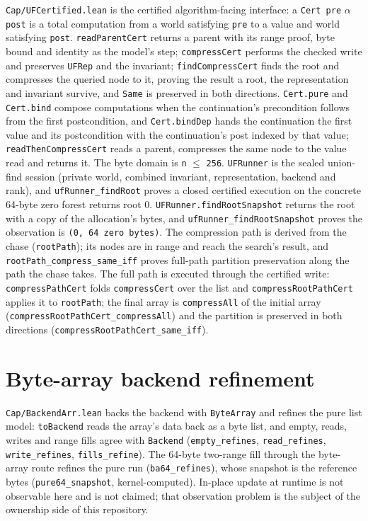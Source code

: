 \documentclass[10pt,a4paper]{article}
\newcommand{\file}[1]{\texttt{\small #1}}
\begin{document}
\file{Cap/UFCertified.lean} is the certified algorithm-facing interface: a
\texttt{Cert pre} $\alpha$ \texttt{post} is a total computation from a world satisfying
\texttt{pre} to a value and world satisfying \texttt{post}.
\texttt{readParentCert} returns a parent with its range proof, byte bound and
identity as the model's step; \texttt{compressCert} performs the checked write
and preserves \texttt{UFRep} and the invariant; \texttt{findCompressCert} finds
the root and compresses the queried node to it, proving the result a root, the
representation and invariant survive, and \texttt{Same} is preserved in both
directions. \texttt{Cert.pure} and \texttt{Cert.bind} compose computations when
the continuation's precondition follows from the first postcondition, and
\texttt{Cert.bindDep} hands the continuation the first value and its
postcondition with the continuation's post indexed by that value;
\texttt{readThenCompressCert} reads a parent, compresses the same node to the
value read and returns it. The
byte domain is \texttt{n} $\le$ \texttt{256}. \texttt{UFRunner} is the sealed
union-find session (private world, combined invariant, representation, backend and
rank), and \texttt{ufRunner\_findRoot} proves a closed certified execution on the
concrete 64-byte zero forest returns root 0. \texttt{UFRunner.findRootSnapshot}
returns the root with a copy of the allocation's bytes, and
\texttt{ufRunner\_findRootSnapshot} proves the observation is \texttt{(0, 64
zero bytes)}. The compression path is derived from the chase
(\texttt{rootPath}); its nodes are in range and reach the search's result, and
\texttt{rootPath\_compress\_same\_iff} proves full-path partition preservation
along the path the chase takes. The full path is executed through the
certified write: \texttt{compressPathCert} folds \texttt{compressCert} over the
list and \texttt{compressRootPathCert} applies it to \texttt{rootPath}; the
final array is \texttt{compressAll} of the initial array
(\texttt{compressRootPathCert\_compressAll}) and the partition is preserved in
both directions (\texttt{compressRootPathCert\_same\_iff}).

\section{Byte-array backend refinement}

\file{Cap/BackendArr.lean} backs the backend with \texttt{ByteArray} and refines
the pure list model: \texttt{toBackend} reads the array's data back as a byte
list, and empty, reads, writes and range fills agree with \texttt{Backend}
(\texttt{empty\_refines}, \texttt{read\_refines}, \texttt{write\_refines},
\texttt{fills\_refine}). The 64-byte two-range fill through the byte-array route
refines the pure run (\texttt{ba64\_refines}), whose snapshot is the reference
bytes (\texttt{pure64\_snapshot}, kernel-computed). In-place update at runtime
is not observable here and is not claimed; that observation problem is the
subject of the ownership side of this repository.
\end{document}
